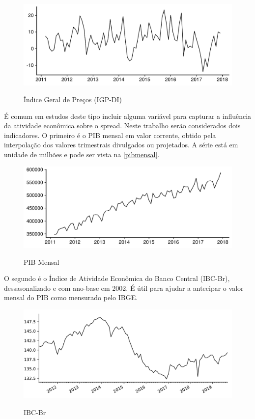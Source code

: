 \documentclass[a4paper,
               article,
               12pt,
               openany,
               oneside,
               english,
               brazil]{abntex2}
\numberwithin{equation}{section}
\begin{document}
\begin{figure}[h]
  \centering
    \caption{Índice Geral de Preços (IGP-DI)}
      \includegraphics[width = \textwidth, scale=0.75]{IGP.pdf}
      \label{igp}
\end{figure}
    
    É comum em estudos deste tipo incluir alguma variável para capturar a influência da atividade econômica sobre o spread. Neste trabalho serão considerados dois indicadores. O primeiro é o PIB mensal em valor corrente, obtido pela interpolação dos valores trimestrais divulgados ou projetados. A série está em unidade de milhões e pode ser vista na \autoref{pibmensal}.

    \begin{figure}[h]
        \centering
        \caption{PIB Mensal}
        \includegraphics[width = \textwidth, scale=0.75]{PIB_Mensal.pdf}
        \label{pibmensal}
    \end{figure}

    O segundo é o Índice de Atividade Econômica do Banco Central (IBC-Br), dessasonalizado e com ano-base em 2002. É útil para ajudar a antecipar o valor mensal do PIB como mensurado pelo IBGE.

    \begin{figure}[h]
        \centering
        \caption{IBC-Br}
        \includegraphics[width = \textwidth, scale=0.75]{IBC.pdf}
        \label{ibc}
    \end{figure}
\end{document}
